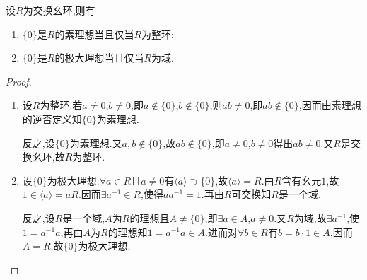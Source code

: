 \documentclass[../../main.tex]{subfiles}%
\begin{document}
\begin{lemma}\label{lemma:抽象代数--引理2.8.1}
设$R$为交换幺环,则有
\begin{enumerate}[(1)]
\item\label{lemma:抽象代数--引理2.8.1-1} $\{0\}$是$R$的素理想当且仅当$R$为整环;

\item\label{lemma:抽象代数--引理2.8.1-2} $\{0\}$是$R$的极大理想当且仅当$R$为域.
\end{enumerate}
\end{lemma}
\begin{proof}
\begin{enumerate}[(1)]
\item 设$R$为整环.若$a \neq 0$,$b \neq 0$,即$a \notin \{0\}$,$b \notin \{0\}$,则$ab \neq 0$,即$ab \notin \{0\}$,因而由素理想的逆否定义知$\{0\}$为素理想.

反之,设$\{0\}$为素理想.又$a,b \notin \{0\}$,故$ab \notin \{0\}$,即$a \neq 0$,$b \neq 0$得出$ab \neq 0$.又$R$是交换幺环,故$R$为整环.

\item 设$\{0\}$为极大理想.$\forall a \in R$且$a \neq 0$有$\langle a \rangle \supset \{0\}$,故$\langle a \rangle = R$.由$R$含有幺元$1$,故$1 \in \langle a \rangle = aR$.因而$\exists a^{-1} \in R$,使得$aa^{-1} = 1$.再由$R$可交换知$R$是一个域.

反之,设$R$是一个域,$A$为$R$的理想且$A \neq \{0\}$,即$\exists a \in A$,$a \neq 0$.又$R$为域,故$\exists a^{-1}$,使$1 = a^{-1}a$,再由$A$为$R$的理想知$1=a^{-1}a \in A$.进而对$\forall b \in R$有$b = b \cdot 1 \in A$,因而$A = R$,故$\{0\}$为极大理想.
\end{enumerate}
\end{proof}
\end{document}
